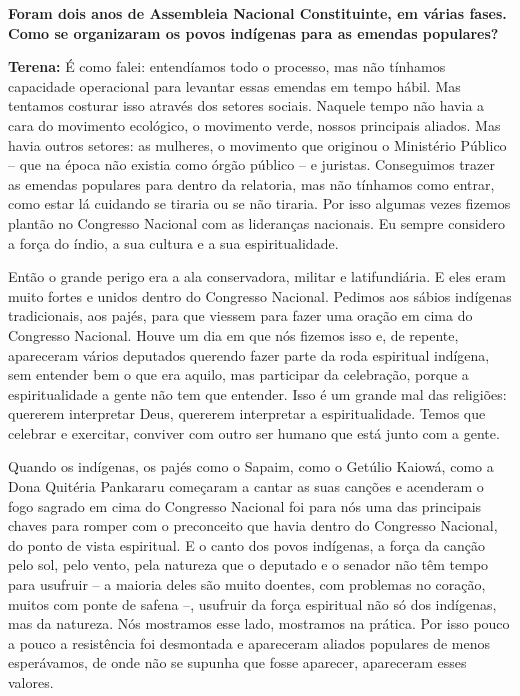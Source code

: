 \textbf{Foram dois anos de Assembleia Nacional Constituinte, em várias
fases. Como se organizaram os povos indígenas para as emendas
populares?}

\textbf{Terena:} É como falei: entendíamos todo o processo, mas não
tínhamos capacidade operacional para levantar essas emendas em tempo
hábil. Mas tentamos costurar isso através dos setores sociais. Naquele
tempo não havia a cara do movimento ecológico, o movimento verde, nossos
principais aliados. Mas havia outros setores: as mulheres, o movimento
que originou o Ministério Público -- que na época não existia como órgão
público -- e juristas. Conseguimos trazer as emendas populares para
dentro da relatoria, mas não tínhamos como entrar, como estar lá
cuidando se tiraria ou se não tiraria. Por isso algumas vezes fizemos
plantão no Congresso Nacional com as lideranças nacionais. Eu sempre
considero a força do índio, a sua cultura e a sua espiritualidade.

Então o grande perigo era a ala conservadora, militar e latifundiária. E
eles eram muito fortes e unidos dentro do Congresso Nacional. Pedimos
aos sábios indígenas tradicionais, aos pajés, para que viessem para
fazer uma oração em cima do Congresso Nacional. Houve um dia em que nós
fizemos isso e, de repente, apareceram vários deputados querendo fazer
parte da roda espiritual indígena, sem entender bem o que era aquilo,
mas participar da celebração, porque a espiritualidade a gente não tem
que entender. Isso é um grande mal das religiões: quererem interpretar
Deus, quererem interpretar a espiritualidade. Temos que celebrar e
exercitar, conviver com outro ser humano que está junto com a gente.

Quando os indígenas, os pajés como o Sapaim, como o Getúlio Kaiowá, como
a Dona Quitéria Pankararu começaram a cantar as suas canções e acenderam
o fogo sagrado em cima do Congresso Nacional foi para nós uma das
principais chaves para romper com o preconceito que havia dentro do
Congresso Nacional, do ponto de vista espiritual. E o canto dos povos
indígenas, a força da canção pelo sol, pelo vento, pela natureza que o
deputado e o senador não têm tempo para usufruir -- a maioria deles são
muito doentes, com problemas no coração, muitos com ponte de safena --,
usufruir da força espiritual não só dos indígenas, mas da natureza. Nós
mostramos esse lado, mostramos na prática. Por isso pouco a pouco a
resistência foi desmontada e apareceram aliados populares de menos
esperávamos, de onde não se supunha que fosse aparecer, apareceram esses
valores.

